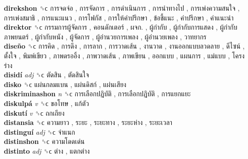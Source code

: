 \textbf{direkshon} ␝ϲ   การจดจ่อ ,  การจัดการ ,  การดำเนินการ ,  การนำทางไป ,  การเพ่งความสนใจ ,  การเพ่งสมาธิ ,  การแนะแนว ,  การโฟกัส ,  การให้คำปรึกษา ,  ข้อชี้แนะ ,  คำปรึกษา ,  คำแนะนำ   \\
\textbf{direktor} ␝ϲ   กรรมการผู้จัดการ ,  คอนดักเตอร์ ,  ผจก. ,  ผู้กำกับ ,  ผู้กำกับการแสดง ,  ผู้กำกับภาพยนตร์ ,  ผู้กำกับหนัง ,  ผู้จัดการ ,  ผู้อำนวยการเพลง ,  ผู้อำนวยเพลง ,  วาทยากร   \\
\textbf{diseño} ␝ϲ   การคิด ,  การดึง ,  การลาก ,  การวาดเส้น ,  งานวาด ,  งานออกแบบลวดลาย ,  ดีไซน์ ,  ตั้งใจ ,  พิมพ์เขียว ,  ภาพดรออิ้ง ,  ภาพวาดเส้น ,  ภาพเขียน ,  ออกแบบ ,  แผนการ ,  แม่แบบ ,  โครงร่าง   \\
\textbf{disidí} \emph{adj}  ␝ϲ   ตัดสิน ,  ตัดสินใจ   \\
\textbf{disko} ␝ϲ   แผ่นกลมแบน ,  แผ่นดิสก์ ,  แผ่นเสียง   \\
\textbf{diskriminashon} \emph{n}  ␝ϲ   การเลือกปฎิบัติ ,  การเลือกปฏิบัติ ,  การแยกแยะ   \\
\textbf{diskulpá} \emph{v}  ␝ϲ   ขอโทษ ,  แก้ตัว   \\
\textbf{diskutí} \emph{v}  ␝ϲ   ถกเถียง   \\
\textbf{distansia} ␝ϲ   ความยาว ,  ระยะ ,  ระยะทาง ,  ระยะห่าง ,  ระยะเวลา   \\
\textbf{distinguí} \emph{adj}  ␝ϲ   จำแนก   \\
\textbf{distinshon} ␝ϲ   ความโดดเด่น   \\
\textbf{distinto} \emph{adj}  ␝ϲ   ต่าง ,  แตกต่าง   \\

